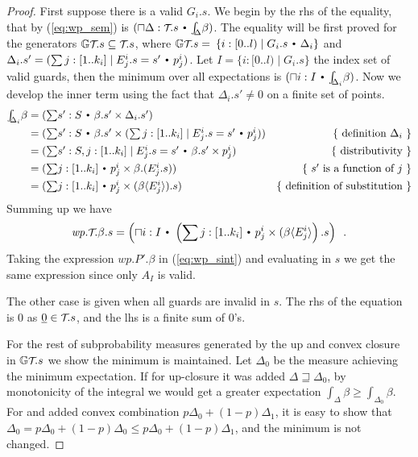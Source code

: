 \documentclass{eptcs}
\theoremstyle{plain}
\theoremstyle{definition}
\newcommand{\lit}[1]{\ensuremath{\mathit{#1}}}
\newcommand{\Prg}{P}
\newcommand{\Tau}{\mbox{\small\ensuremath{\mathcal{T}}}\!}
\newcommand{\GenTau}{\mathbb{G}\Tau}
\newcommand{\Subst}[2][]
	{ \ensuremath{\ifthenelse{\equal{#1}{}}{\langle #2 \rangle}{\langle #1\mapsto #2 \rangle} }}
\newcommand{\dotsep}{\mbox{\raisebox{0.4ex}{\tiny\ensuremath{\:\;\bullet\;\:}}}}
\newcommand{\Const}[1]{\ensuremath{\underline{#1}}}
\newcommand{\Wp}{\lit{wp}}
\newcommand{\Min}{\ensuremath{\sqcap}}
\begin{document}
\begin{proof}
First suppose there is a valid $G_i.s$.
We begin by the rhs of the equality, that by (\ref{eq:wp_sem}) is $(\Min \Delta : \Tau.s \dotsep {\textstyle{\int}_{\!\!\!\Delta}} \beta)$.
The equality will be first proved for the generators $\GenTau.s\subseteq\Tau.s$,
where $\GenTau.s =$ \mbox{$\{ i:[0..l) \mid G_i.s \dotsep \Delta_i \}$}
and $\Delta_i.s' = ( \sum j: [1..k_i] \mid E_j^i.s = s' \dotsep p_j^i )$.
Let $I = \{i:[0..l) \mid G_i.s\}$ the index set of valid guards, then the minimum over all expectations is
$(\Min i:I \dotsep {\textstyle{\int}_{\!\!\!\Delta_i}} \beta) $.
Now we develop the inner term using the fact that $\Delta_i.s'\neq 0$ on a finite set of points.
\begin{align*}
	{\textstyle{\int}_{\!\!\!\Delta_i}} \beta & = (\textstyle{\sum} s':S \dotsep \beta.s'\times \Delta_i.s') & \\
	& =  ( \textstyle{\sum} s':S \dotsep \beta.s'\times (\sum j: [1..k_i] \mid E_j^i.s = s' \dotsep p_j^i) ) & \mbox{\{ definition $\Delta_i$ \}}\\
	& =  ( \textstyle{\sum} s':S, j: [1..k_i] \mid E_j^i.s = s' \dotsep \beta.s' \times p_j^i ) & \mbox{\{ distributivity \}} \\
	& =  ( \textstyle{\sum} j: [1..k_i] \dotsep p_j^i \times \beta.(E_j^i.s) ) & \mbox{\{ $s'$ is a function of $j$ \}} \\
	& =  ( \textstyle{\sum} j: [1..k_i] \dotsep p_j^i \times (\beta\Subst{E_j^i}).s ) & \mbox{\{ definition of substitution \}} \\
\end{align*}
Summing up we have
\[ \Wp{}.\Tau.\beta.s = \left( \Min i:I \dotsep \left(\sum j: [1..k_i] \dotsep p_j^i \times (\beta\Subst{E_j^i}\right).s\right)\enspace. \]
Taking the expression $\Wp{}.\Prg'.\beta$ in (\ref{eq:wp_sint}) and evaluating in $s$ we get the same expression since only $A_I$ is valid.

The other case is given when all guards are invalid in $s$.
The rhs of the equation is $0$ as $\Const{0}\in\Tau.s$, and the lhs is a finite sum of $0$'s.

For the rest of subprobability measures generated by the up and convex closure in $\GenTau.s$ we show the minimum is maintained.
Let $\Delta_0$ be the measure achieving the minimum expectation.
If for up-closure it was added $\Delta\sqsupseteq \Delta_0$, by monotonicity of the integral we would get a greater expectation ${\textstyle{\int}_{\!\!\!\Delta}} \beta \geq {\textstyle{\int}_{\!\!\!\Delta_0}} \beta$.
For and added convex combination $p\Delta_0 + (1-p) \Delta_1$, it is easy to show that $\Delta_0 = p\Delta_0 + (1-p) \Delta_0\leq p\Delta_0 + (1-p) \Delta_1$, and the minimum is not changed.
\end{proof}
\end{document}
